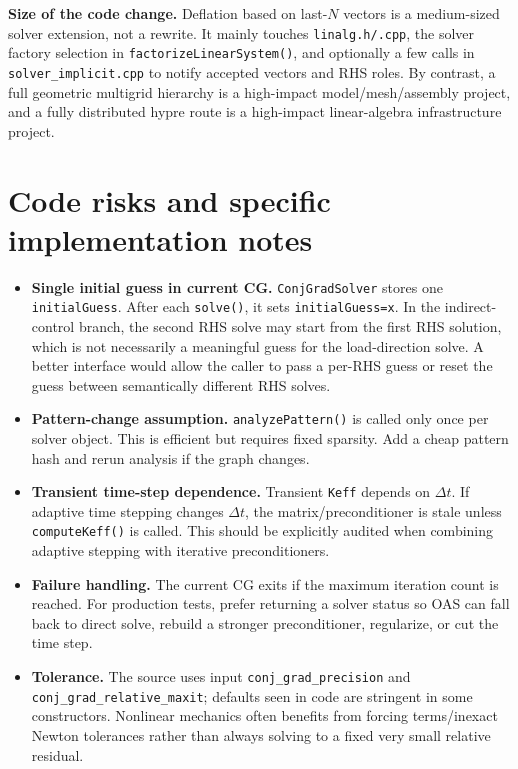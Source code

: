 \documentclass[10pt,a4paper]{article}
\newcommand{\code}[1]{\texttt{#1}}
\begin{document}
\textbf{Size of the code change.} Deflation based on last-$N$ vectors is a medium-sized solver extension, not a rewrite. It mainly touches \code{linalg.h/.cpp}, the solver factory selection in \code{factorizeLinearSystem()}, and optionally a few calls in \code{solver\_implicit.cpp} to notify accepted vectors and RHS roles. By contrast, a full geometric multigrid hierarchy is a high-impact model/mesh/assembly project, and a fully distributed hypre route is a high-impact linear-algebra infrastructure project.

\section{Code risks and specific implementation notes}

\begin{itemize}
  \item \textbf{Single initial guess in current CG.} \code{ConjGradSolver} stores one \code{initialGuess}. After each \code{solve()}, it sets \code{initialGuess=x}. In the indirect-control branch, the second RHS solve may start from the first RHS solution, which is not necessarily a meaningful guess for the load-direction solve. A better interface would allow the caller to pass a per-RHS guess or reset the guess between semantically different RHS solves.
  \item \textbf{Pattern-change assumption.} \code{analyzePattern()} is called only once per solver object. This is efficient but requires fixed sparsity. Add a cheap pattern hash and rerun analysis if the graph changes.
  \item \textbf{Transient time-step dependence.} Transient \code{Keff} depends on \(\Delta t\). If adaptive time stepping changes \(\Delta t\), the matrix/preconditioner is stale unless \code{computeKeff()} is called. This should be explicitly audited when combining adaptive stepping with iterative preconditioners.
  \item \textbf{Failure handling.} The current CG exits if the maximum iteration count is reached. For production tests, prefer returning a solver status so OAS can fall back to direct solve, rebuild a stronger preconditioner, regularize, or cut the time step.
  \item \textbf{Tolerance.} The source uses input \code{conj\_grad\_precision} and \code{conj\_grad\_relative\_maxit}; defaults seen in code are stringent in some constructors. Nonlinear mechanics often benefits from forcing terms/inexact Newton tolerances rather than always solving to a fixed very small relative residual.
\end{itemize}
\end{document}
